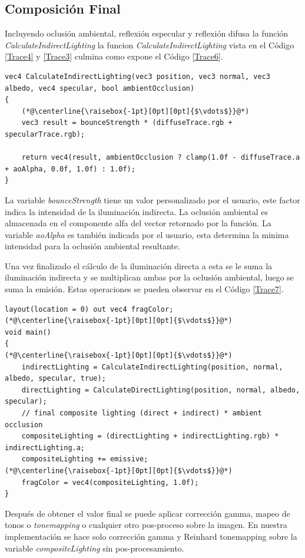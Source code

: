 \subsection{Composición Final} %
\label{sub:composicion_final}
Incluyendo oclusión ambiental, reflexión especular y reflexión difusa la función \emph{CalculateIndirectLighting} la funcion \emph{CalculateIndirectLighting} vista en el Código \ref{Trace4} y \ref{Trace3} culmina como expone el Código \ref{Trace6}.
\\
\begin{lstlisting}[caption={Composición para la iluminación indirecta.}, label=Trace6]
vec4 CalculateIndirectLighting(vec3 position, vec3 normal, vec3 albedo, vec4 specular, bool ambientOcclusion)
{
    (*@\centerline{\raisebox{-1pt}[0pt][0pt]{$\vdots$}}@*)
    vec3 result = bounceStrength * (diffuseTrace.rgb + specularTrace.rgb);

    return vec4(result, ambientOcclusion ? clamp(1.0f - diffuseTrace.a + aoAlpha, 0.0f, 1.0f) : 1.0f);
}
\end{lstlisting}
La variable \emph{bounceStrength} tiene un valor personalizado por el usuario, este factor indica la intensidad de la iluminación indirecta. La oclusión ambiental es almacenada en el componente alfa del vector retornado por la función. La variable \emph{aoAlpha} es también indicada por el usuario, esta determina la minima intensidad para la oclusión ambiental resultante.

Una vez finalizado el cálculo de la iluminación directa a esta se le suma la iluminación indirecta y se multiplican ambas por la oclusión ambiental, luego se suma la emisión. Estas operaciones se pueden observar en el Código \ref{Trace7}.
\\
\begin{lstlisting}[caption={Composición final de imagen.}, label=Trace7]
layout(location = 0) out vec4 fragColor;
(*@\centerline{\raisebox{-1pt}[0pt][0pt]{$\vdots$}}@*)
void main()
{
(*@\centerline{\raisebox{-1pt}[0pt][0pt]{$\vdots$}}@*)
    indirectLighting = CalculateIndirectLighting(position, normal, albedo, specular, true);
    directLighting = CalculateDirectLighting(position, normal, albedo, specular);
    // final composite lighting (direct + indirect) * ambient occlusion
    compositeLighting = (directLighting + indirectLighting.rgb) * indirectLighting.a;
    compositeLighting += emissive;
(*@\centerline{\raisebox{-1pt}[0pt][0pt]{$\vdots$}}@*)
    fragColor = vec4(compositeLighting, 1.0f);
}
\end{lstlisting}
Después de obtener el valor final se puede aplicar corrección gamma, mapeo de tonos o \emph{tonemapping} o cualquier otro pos-proceso sobre la imagen. En nuestra implementación se hace solo corrección gamma y Reinhard tonemapping \cite{Reinhard:2002:PTR:566570.566575} sobre la variable \emph{compositeLighting} sin pos-procesamiento.
